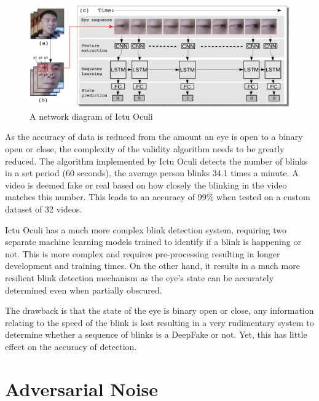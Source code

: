 \begin{figure}[h]
    \centering
    \includegraphics[width=0.75\linewidth]{dissertation//figures/ictu-oculi.png}
    \caption{A network diagram of Ictu Oculi\cite{li2018ictu}}
    \label{fig:ictu-oculi}
\end{figure}

As the accuracy of data is reduced from the amount an eye is open to a binary open or close, the complexity of the validity algorithm needs to be greatly reduced. The algorithm implemented by Ictu Oculi detects the number of blinks in a set period (60 seconds), the average person blinks 34.1 times a minute. A video is deemed fake or real based on how closely the blinking in the video matches this number. This leads to an accuracy of 99\% when tested on a custom dataset of 32 videos.

Ictu Oculi has a much more complex blink detection system, requiring two separate machine learning models trained to identify if a blink is happening or not. This is more complex and requires pre-processing resulting in longer development and training times. On the other hand, it results in a much more resilient blink detection mechanism as the eye's state can be accurately determined even when partially obscured.

The drawback is that the state of the eye is binary open or close, any information relating to the speed of the blink is lost resulting in a very rudimentary system to determine whether a sequence of blinks is a DeepFake or not. Yet, this has little effect on the accuracy of detection.

\section{Adversarial Noise}



